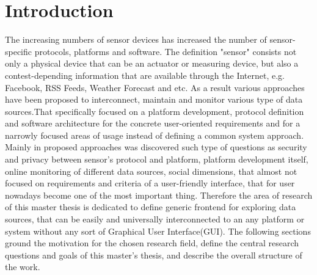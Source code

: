 
\chapter{Introduction}

  \begin{singlespace}
     The increasing numbers of sensor devices has increased the number of sensor-specific protocols, platforms and software.  The definition "sensor" consists not only a physical device that can be an actuator or measuring device, but also a contest-depending information that are available through the Internet, e.g. Facebook, RSS Feeds, Weather Forecast and etc. As a result various approaches have been proposed to interconnect, maintain and monitor various type of data sources\cite{6588063,bendel2013service,song2010real}.That specifically focused on a platform development, protocol definition and software architecture for the concrete user-oriented requirements and for a narrowly focused areas of usage instead of defining a common system approach. Mainly in proposed approaches was discovered such type of questions as security and privacy between sensor's protocol and platform, platform development itself, online monitoring of different data sources, social dimensions\cite{eggert2013sensorcloud}, that almost not focused on requirements and criteria of a user-friendly interface, that for user nowadays become one of the most important thing. Therefore the area of research of this master thesis is dedicated to define generic frontend for exploring data sources, that can be easily and universally interconnected to an any platform or system without any sort of Graphical User Interface(GUI). The following sections ground the motivation for the chosen research field, define the central research questions and goals of this master's thesis, and describe the overall structure of the work.
  \end{singlespace}

